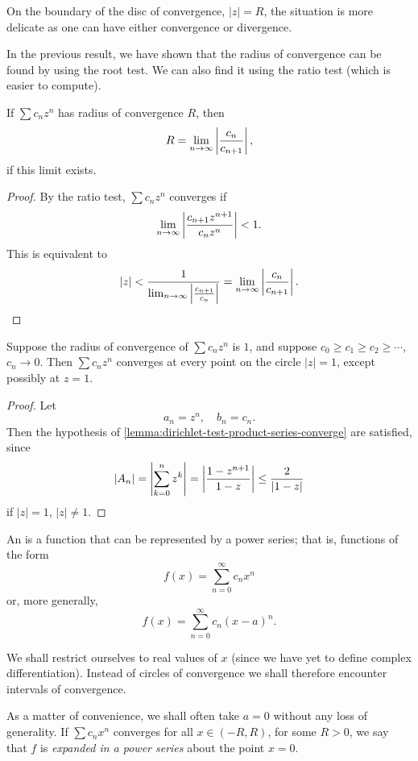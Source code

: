 \begin{remark}
On the boundary of the disc of convergence, $|z|=R$, the situation is more delicate as one can have either convergence or divergence.
\end{remark}

In the previous result, we have shown that the radius of convergence can be found by using the root test. We can also find it using the ratio test (which is easier to compute).

\begin{lemma}
If $\sum c_nz^n$ has radius of convergence $R$, then
\[R=\lim_{n\to\infty}\left|\frac{c_n}{c_{n+1}}\right|,\]
if this limit exists.
\end{lemma}

\begin{proof}
By the ratio test, $\sum c_nz^n$ converges if 
\[\lim_{n\to\infty}\left|\frac{c_{n+1}z^{n+1}}{c_nz^n}\right|<1.\]
This is equivalent to
\[|z|<\frac{1}{\lim_{n\to\infty}\left|\frac{c_{n+1}}{c_n}\right|}=\lim_{n\to\infty}\left|\frac{c_n}{c_{n+1}}\right|.\]
\end{proof}

\begin{proposition}
Suppose the radius of convergence of $\sum c_nz^n$ is $1$, and suppose $c_0\ge c_1\ge c_2\ge\cdots$, $c_n\to0$. Then $\sum c_nz^n$ converges at every point on the circle $|z|=1$, except possibly at $z=1$.
\end{proposition}

\begin{proof}
Let
\[a_n=z^n,\quad b_n=c_n.\]
Then the hypothesis of \cref{lemma:dirichlet-test-product-series-converge} are satisfied, since
\[|A_n|=\left|\sum_{k=0}^{n}z^k\right|=\left|\frac{1-z^{n+1}}{1-z}\right|\le\frac{2}{|1-z|}\]
if $|z|=1$, $|z|\neq1$.
\end{proof}

\begin{definition}
An  is a function that can be represented by a power series; that is, functions of the form
\[f(x)=\sum_{n=0}^\infty c_n x^n\]
or, more generally,
\[f(x)=\sum_{n=0}^\infty c_n(x-a)^n.\]
\end{definition}

We shall restrict ourselves to real values of $x$ (since we have yet to define complex differentiation). Instead of circles of convergence we shall therefore encounter intervals of convergence. 

As a matter of convenience, we shall often take $a=0$ without any loss of generality. If $\sum c_nx^n$ converges for all $x\in(-R,R)$, for some $R>0$, we say that $f$ is \emph{expanded in a power series} about the point $x=0$.

